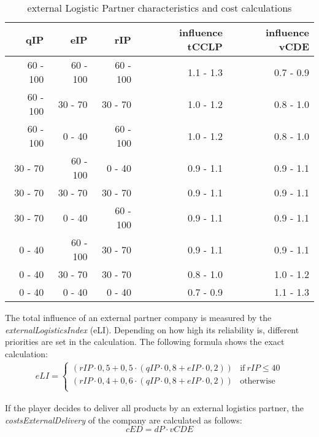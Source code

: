 \begin{table}[ht]
    \centering
    \begin{tabular}{|r|r|r|r|r|}
    \hline
    \textbf{qIP} & \textbf{eIP} & \textbf{rIP} & \textbf{influence tCCLP} & \textbf{influence vCDE} \\ \hline
    60 - 100      & 60 - 100   & 60 - 100  & 1.1 - 1.3    & 0.7 - 0.9     \\
    60 - 100      & 30 - 70    & 30 - 70   & 1.0 - 1.2    & 0.8 - 1.0     \\
    60 - 100      & 0 - 40     & 60 - 100  & 1.0 - 1.2    & 0.8 - 1.0     \\
    30 - 70       & 60 - 100   & 0 - 40    & 0.9 - 1.1    & 0.9 - 1.1     \\
    30 - 70       & 30 - 70    & 30 - 70   & 0.9 - 1.1    & 0.9 - 1.1     \\
    30 - 70       & 0 - 40     & 60 - 100  & 0.9 - 1.1    & 0.9 - 1.1     \\
    0 - 40        & 60 - 100   & 30 - 70   & 0.9 - 1.1    & 0.9 - 1.1     \\
    0 - 40        & 30 - 70    & 30 - 70   & 0.8 - 1.0    & 1.0 - 1.2     \\
    0 - 40        & 0 - 40     & 0 - 40    & 0.7 - 0.9    & 1.1 - 1.3     \\
    \hline
    \end{tabular}
    \caption{external Logistic Partner characteristics and cost calculations}
    \label{External_logistic_partner_characteristics}
\end{table}

The total influence of an external partner company is measured by the \textit{externalLogisticsIndex} (\gls{eLI}). Depending on how high its reliability is, different priorities are set in the calculation. The following formula shows the exact calculation: 
\begin{equation}
\label{func:externalLogisticIndex}
\begin{aligned}
eLI = 
    \begin{cases}
     (rIP\cdot0,5 + 0,5\cdot(qIP\cdot0,8 + eIP\cdot0,2)) & \text{if} ~rIP \leq 40\\
     (rIP\cdot0,4 + 0,6\cdot(qIP\cdot0,8 + eIP\cdot0,2)) & \text{otherwise} \\
    \end{cases}
\end{aligned}
\end{equation}

If the player decides to deliver all products by an external logistics partner, the \textit{costsExternalDelivery} of the company are calculated as follows:
\begin{equation}
\label{func:costExternalDelivery_all}
   cED = dP \cdot vCDE
\end{equation}

